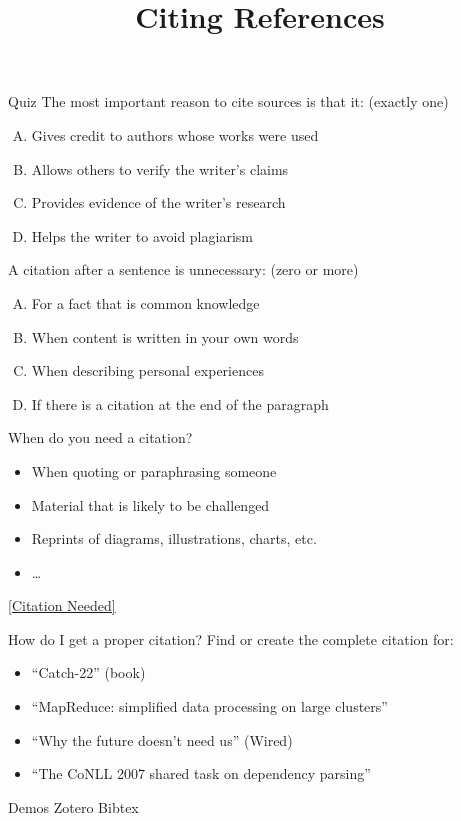 \documentclass{beamer}
\title{Citing References}
\date{}
\begin{document}
\begin{frame}
\titlepage
\end{frame}

\begin{frame}{Quiz}
The most important reason to cite sources is that it: \hfill (exactly one)
\begin{enumerate}[(A)]
\item<1> Gives credit to authors whose works were used
\item<1-2> Allows others to verify the writer's claims
\item<1> Provides evidence of the writer's research
\item<1> Helps the writer to avoid plagiarism
\end{enumerate}
\bigskip
A citation after a sentence is unnecessary: \hfill (zero or more)
\begin{enumerate}[(A)]
\item<1> For a fact that is common knowledge
\item<1> When content is written in your own words
\item<1-2> When describing personal experiences
\item<1> If there is a citation at the end of the paragraph
\end{enumerate}
\end{frame}

\begin{frame}{When do you need a citation?}
\pause
\begin{itemize}
\item When quoting or paraphrasing someone
\item Material that is likely to be challenged
\item Reprints of diagrams, illustrations, charts, etc.
\item \ldots
\end{itemize}
\pause
\centering
\href{http://citationneeded.tumblr.com/}{[Citation Needed]}
\end{frame}

\begin{frame}{How do I get a proper citation?}
Find or create the complete citation for:
\begin{itemize}
\item ``Catch-22'' (book)
\item ``MapReduce: simplified data processing on large clusters''
\item ``Why the future doesn't need us'' (Wired)
\item ``The CoNLL 2007 shared task on dependency parsing''
\end{itemize}
\end{frame}

\begin{frame}{Demos}
\centering
\huge
Zotero
\hspace{5em}
Bibtex
\end{frame}
\end{document}
